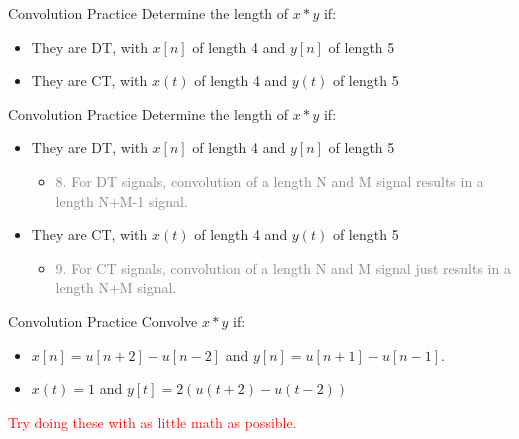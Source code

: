 \begin{frame}{Convolution Practice}
    Determine the length of $x*y$ if: 
    \begin{itemize}
        \item They are DT, with $x[n]$ of length 4 and $y[n]$ of length 5
        \item They are CT, with $x(t)$ of length 4 and $y(t)$ of length 5
    \end{itemize}
\end{frame}
\begin{frame}{Convolution Practice}
    Determine the length of $x*y$ if: 
    \begin{itemize}
        \item They are DT, with $x[n]$ of length 4 and $y[n]$ of length 5
        \begin{itemize} 
            \item \textcolor{gray}{8. For DT signals, convolution of a length N and M signal results in a length N+M-1 signal.}
        \end{itemize}
        \item They are CT, with $x(t)$ of length 4 and $y(t)$ of length 5
        \begin{itemize} 
            \item \textcolor{gray}{9. For CT signals, convolution of a length N and M signal just results in a length N+M signal.}
        \end{itemize}
    \end{itemize}
\end{frame}
\begin{frame}{Convolution Practice}
    Convolve $x*y$ if: 
    \begin{itemize}
        \item $x[n] = u[n+2]-u[n-2]$ and $y[n]=u[n+1]-u[n-1]$.
        \item $x(t) = 1$ and $y[t] = 2(u(t+2)-u(t-2))$
    \end{itemize}
    \textcolor{red}{Try doing these with as little math as possible.}
\end{frame}
